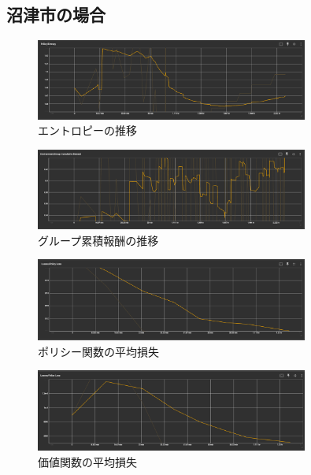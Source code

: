 \subsection{沼津市の場合}
\begin{figure}[H] 
  \centering 
  \includegraphics[width=0.8\textwidth]{Figures/NumazuEntropy.png}
  \caption{エントロピーの推移} 
  \label{fig:fig-01}
\end{figure}
\begin{figure}[H] 
  \centering 
  \includegraphics[width=0.8\textwidth]{Figures/NumazuGroupReward.png}
  \caption{グループ累積報酬の推移} 
  \label{fig:fig-01}
\end{figure}
\begin{figure}[H] 
  \centering 
  \includegraphics[width=0.8\textwidth]{Figures/NumazuPolicyLoss.png}
  \caption{ポリシー関数の平均損失} 
  \label{fig:fig-01}
\end{figure}
\begin{figure}[H] 
  \centering 
  \includegraphics[width=0.8\textwidth]{Figures/NumazuValueLoss.png}
  \caption{価値関数の平均損失} 
  \label{fig:fig-01}
\end{figure}

